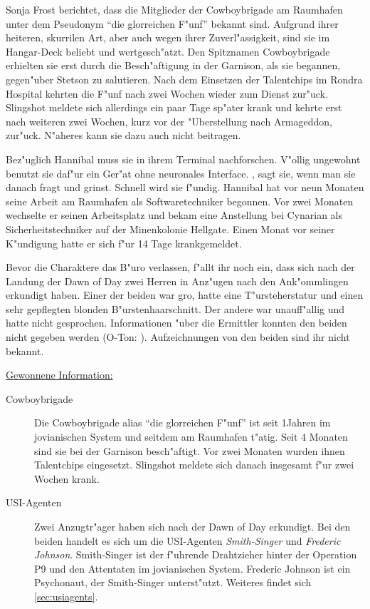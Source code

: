 Sonja Frost berichtet, dass die Mitglieder der Cowboybrigade am Raumhafen unter dem Pseudonym ``die glorreichen F"unf'' bekannt sind. Aufgrund ihrer heiteren, skurrilen Art, aber auch wegen ihrer Zuverl"assigkeit, sind sie im Hangar-Deck beliebt und wertgesch"atzt. Den Spitznamen Cowboybrigade erhielten sie erst durch die Besch"aftigung in der Garnison, als sie begannen, gegen"uber Stetson zu salutieren. Nach dem Einsetzen der Talentchips im Rondra Hospital kehrten die F"unf nach zwei Wochen wieder zum Dienst zur"uck. Slingshot meldete sich allerdings ein paar Tage sp"ater krank und kehrte erst nach weiteren zwei Wochen, kurz vor der "Uberstellung nach Armageddon, zur"uck. N"aheres kann sie dazu auch nicht beitragen.

Bez"uglich Hannibal muss sie in ihrem Terminal nachforschen. V"ollig ungewohnt benutzt sie daf"ur ein Ger"at ohne neuronales Interface. , sagt sie, wenn man sie danach fragt und grinst. Schnell wird sie f"undig. Hannibal hat vor neun Monaten seine Arbeit am Raumhafen als Softwaretechniker begonnen. Vor zwei Monaten wechselte er seinen Arbeitsplatz und bekam eine Anstellung bei Cynarian als Sicherheitstechniker auf der Minenkolonie Hellgate. Einen Monat vor seiner K"undigung hatte er sich f"ur 14 Tage krankgemeldet.

Bevor die Charaktere das B"uro verlassen, f"allt ihr noch ein, dass sich nach der Landung der Dawn of Day zwei Herren in Anz"ugen nach den Ank"ommlingen erkundigt haben. Einer der beiden war gro\3, hatte eine T"ursteherstatur und einen sehr gepflegten blonden B"urstenhaarschnitt. Der andere war unauff"allig und hatte nicht gesprochen. Informationen "uber die Ermittler konnten den beiden nicht gegeben werden (O-Ton: ). Aufzeichnungen von den beiden sind ihr nicht bekannt.

\begin{remarks}
	\underline{Gewonnene Information:}
	
	\begin{description}
		\item[Cowboybrigade] Die Cowboybrigade alias ``die glorreichen F"unf'' ist seit 1\half Jahren im jovianischen System und seitdem am 
			Raumhafen t"atig. Seit 4 Monaten sind sie bei der Garnison besch"aftigt. Vor zwei Monaten wurden ihnen Talentchips eingesetzt. Slingshot meldete sich danach insgesamt f"ur zwei Wochen krank.
		\item[USI-Agenten] Zwei Anzugtr"ager haben sich nach der Dawn of Day erkundigt. Bei den beiden handelt es sich um die USI-Agenten  
			\emph{Smith-Singer} und \emph{Frederic Johnson}. Smith-Singer ist der f"uhrende Drahtzieher hinter der Operation P9 und den Attentaten im jovianischen System. Frederic Johnson ist ein Psychonaut, der Smith-Singer unterst"utzt. Weiteres findet sich \cref{sec:usiagents}.
	\end{description}
\end{remarks}


